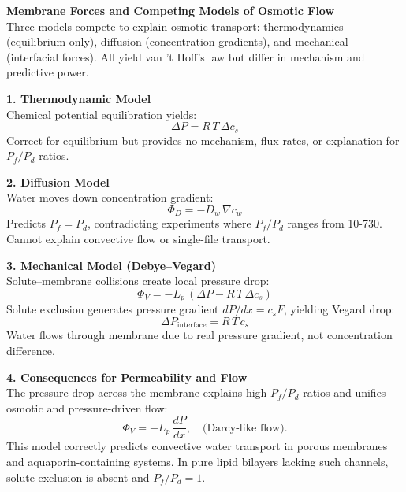 \begin{technical}
{\Large\textbf{Membrane Forces and Competing Models of Osmotic Flow}}\\[0.7em]

Three models compete to explain osmotic transport: thermodynamics (equilibrium only), diffusion (concentration gradients), and mechanical (interfacial forces). All yield van 't Hoff's law but differ in mechanism and predictive power.

\noindent\textbf{1. Thermodynamic Model}\\[0.5em]
Chemical potential equilibration yields:
\begin{equation}
\Delta P = R\,T\,\Delta c_s
\end{equation}
Correct for equilibrium but provides no mechanism, flux rates, or explanation for $P_f / P_d$ ratios.

\noindent\textbf{2. Diffusion Model}\\[0.5em]
Water moves down concentration gradient:
\begin{equation}
\Phi_D = -D_w \,\nabla c_w
\end{equation}
Predicts $P_f = P_d$, contradicting experiments where $P_f/P_d$ ranges from 10-730. Cannot explain convective flow or single-file transport.

\noindent\textbf{3. Mechanical Model (Debye–Vegard)}\\[0.5em]
Solute–membrane collisions create local pressure drop:
\begin{equation}
\Phi_V = -L_p\,(\Delta P - R\,T\,\Delta c_s)
\end{equation}
Solute exclusion generates pressure gradient $dP/dx = c_s F$, yielding Vegard drop:
\begin{equation}
\Delta P_\text{interface} = R\,T\,c_s
\end{equation}
Water flows through membrane due to real pressure gradient, not concentration difference.

\noindent\textbf{4. Consequences for Permeability and Flow}\\[0.5em]
The pressure drop across the membrane explains high $P_f / P_d$ ratios and unifies osmotic and pressure-driven flow:
\begin{equation}
\Phi_V = -L_p\,\frac{dP}{dx}, \quad \text{(Darcy-like flow)}.
\end{equation}
This model correctly predicts convective water transport in porous membranes and aquaporin-containing systems. In pure lipid bilayers lacking such channels, solute exclusion is absent and $P_f / P_d = 1$.


\end{technical}

